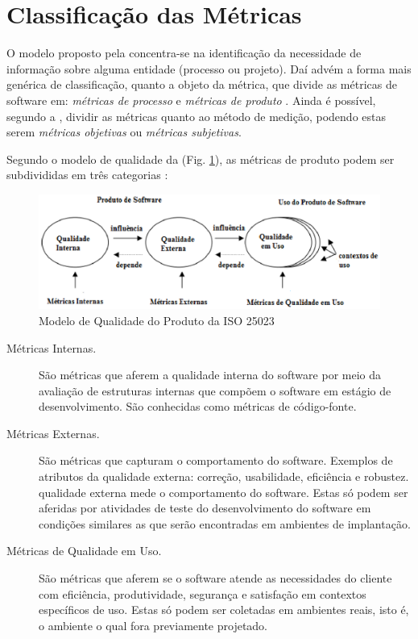 \section{Classificação das Métricas}	
\label {Classificação das Métricas}
O modelo proposto pela  concentra-se na identificação da 
necessidade de informação sobre alguma entidade (processo ou projeto). Daí advém
a forma mais genérica de classificação, quanto a objeto da métrica, que divide 
as métricas de software em: \textit{métricas de processo} e 
\textit{métricas de produto} \cite{Mills:1999}. Ainda é possível, segundo a 
, dividir as métricas quanto ao método de medição, podendo
estas serem \textit{métricas objetivas} ou \textit{métricas subjetivas}.


Segundo o modelo de qualidade da  
(Fig. \ref{modelodequalidade}), as métricas de produto podem ser subdivididas 
em três categorias :
				
\begin{figure}[h]
\centering
\includegraphics[keepaspectratio=false,scale=0.7]{figuras/modelodequalidade.eps}
\caption{Modelo de Qualidade do Produto da ISO 25023}
\label{modelodequalidade}
\end{figure}
			
\begin{description}
		\item[Métricas Internas.] 
		São métricas que aferem a qualidade interna do software por meio da 
		avaliação de estruturas internas que compõem o software em estágio de 
		desenvolvimento. São conhecidas como métricas de código-fonte.

		\item[Métricas Externas.]
		São métricas que capturam o comportamento do software. Exemplos de 
		atributos da qualidade externa: correção, usabilidade, eficiência e 
		robustez. qualidade externa mede  o comportamento do software. Estas só 
		podem ser aferidas por atividades de teste do desenvolvimento do 
		software em condições similares as que serão encontradas em ambientes de
		implantação.

		\item[Métricas de Qualidade em Uso.]
		 São métricas que aferem se o software atende as necessidades do cliente
		 com eficiência, produtividade, segurança e satisfação em contextos 
		 específicos de uso. Estas só podem ser coletadas em ambientes reais, 
		 isto é, o ambiente o qual fora previamente projetado.
			 
\end{description}
		
